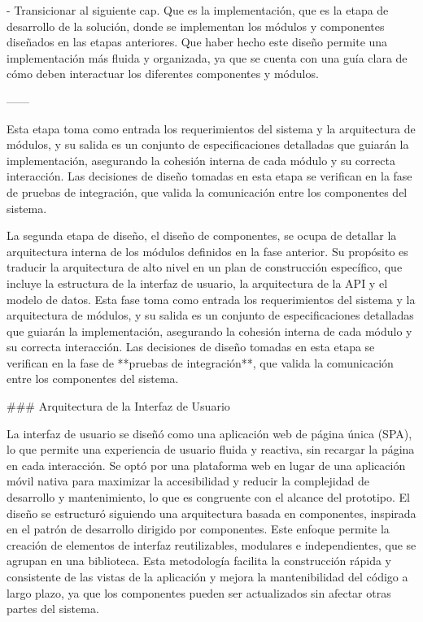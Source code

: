- Transicionar al siguiente cap. Que es la implementación, que es la etapa de desarrollo de la solución, donde se implementan los módulos y componentes diseñados en las etapas anteriores. Que haber hecho este diseño permite una implementación más fluida y organizada, ya que se cuenta con una guía clara de cómo deben interactuar los diferentes componentes y módulos.

------ 

Esta etapa toma como entrada los requerimientos del sistema y la arquitectura de módulos, y su salida es un conjunto de especificaciones detalladas que guiarán la implementación, asegurando la cohesión interna de cada módulo y su correcta interacción. Las decisiones de diseño tomadas en esta etapa se verifican en la fase de pruebas de integración, que valida la comunicación entre los componentes del sistema.

La segunda etapa de diseño, el diseño de componentes, se ocupa de detallar la arquitectura interna de los módulos definidos en la fase anterior. Su propósito es traducir la arquitectura de alto nivel en un plan de construcción específico, que incluye la estructura de la interfaz de usuario, la arquitectura de la API y el modelo de datos. Esta fase toma como entrada los requerimientos del sistema y la arquitectura de módulos, y su salida es un conjunto de especificaciones detalladas que guiarán la implementación, asegurando la cohesión interna de cada módulo y su correcta interacción. Las decisiones de diseño tomadas en esta etapa se verifican en la fase de **pruebas de integración**, que valida la comunicación entre los componentes del sistema.

### Arquitectura de la Interfaz de Usuario

La interfaz de usuario se diseñó como una aplicación web de página única (SPA), lo que permite una experiencia de usuario fluida y reactiva, sin recargar la página en cada interacción. Se optó por una plataforma web en lugar de una aplicación móvil nativa para maximizar la accesibilidad y reducir la complejidad de desarrollo y mantenimiento, lo que es congruente con el alcance del prototipo. El diseño se estructuró siguiendo una arquitectura basada en componentes, inspirada en el patrón de desarrollo dirigido por componentes. Este enfoque permite la creación de elementos de interfaz reutilizables, modulares e independientes, que se agrupan en una biblioteca. Esta metodología facilita la construcción rápida y consistente de las vistas de la aplicación y mejora la mantenibilidad del código a largo plazo, ya que los componentes pueden ser actualizados sin afectar otras partes del sistema.

